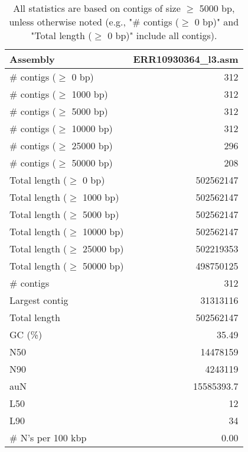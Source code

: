 \documentclass[12pt,a4paper]{article}
\begin{document}
\begin{table}[ht]
\begin{center}
\caption{All statistics are based on contigs of size $\geq$ 5000 bp, unless otherwise noted (e.g., "\# contigs ($\geq$ 0 bp)" and "Total length ($\geq$ 0 bp)" include all contigs).}
\begin{tabular}{|l*{1}{|r}|}
\hline
Assembly & ERR10930364\_l3.asm \\ \hline
\# contigs ($\geq$ 0 bp) & 312 \\ \hline
\# contigs ($\geq$ 1000 bp) & 312 \\ \hline
\# contigs ($\geq$ 5000 bp) & 312 \\ \hline
\# contigs ($\geq$ 10000 bp) & 312 \\ \hline
\# contigs ($\geq$ 25000 bp) & 296 \\ \hline
\# contigs ($\geq$ 50000 bp) & 208 \\ \hline
Total length ($\geq$ 0 bp) & 502562147 \\ \hline
Total length ($\geq$ 1000 bp) & 502562147 \\ \hline
Total length ($\geq$ 5000 bp) & 502562147 \\ \hline
Total length ($\geq$ 10000 bp) & 502562147 \\ \hline
Total length ($\geq$ 25000 bp) & 502219353 \\ \hline
Total length ($\geq$ 50000 bp) & 498750125 \\ \hline
\# contigs & 312 \\ \hline
Largest contig & 31313116 \\ \hline
Total length & 502562147 \\ \hline
GC (\%) & 35.49 \\ \hline
N50 & 14478159 \\ \hline
N90 & 4243119 \\ \hline
auN & 15585393.7 \\ \hline
L50 & 12 \\ \hline
L90 & 34 \\ \hline
\# N's per 100 kbp & 0.00 \\ \hline
\end{tabular}
\end{center}
\end{table}
\end{document}
